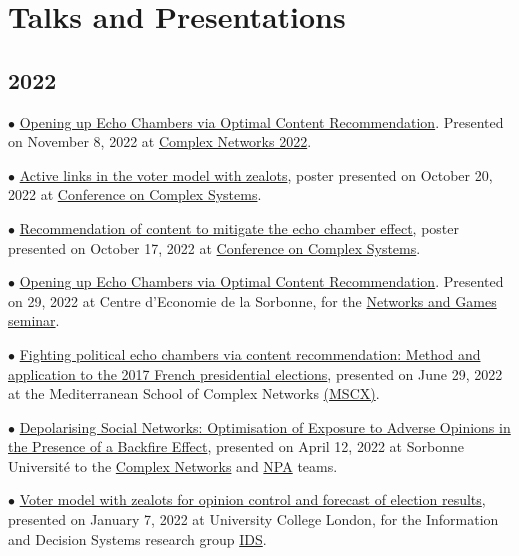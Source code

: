 \documentclass[a4paper,10pt]{article}
\begin{document}
\section*{Talks and Presentations}
\subsection*{2022}

$\bullet$ \href{https://antoinevendeville.github.io/files/talk_NetworksAndGames.pdf}{Opening up Echo Chambers via Optimal Content Recommendation}. Presented on November 8, 2022 at \href{https://complexnetworks.org/}{Complex Networks 2022}.

$\bullet$ \href{https://antoinevendeville.github.io/files/poster_ccs2022_voter.pdf}{Active links in the voter model with zealots}, poster presented on October 20, 2022 at \href{https://ccs2022.org/}{Conference on Complex Systems}.

$\bullet$ \href{https://antoinevendeville.github.io/files/poster_ccs2022_echo.pdf}{Recommendation of content to mitigate the echo chamber effect}, poster presented on October 17, 2022 at \href{https://ccs2022.org/}{Conference on Complex Systems}.

$\bullet$ \href{https://antoinevendeville.github.io/files/talk_NetworksAndGames.pdf}{Opening up Echo Chambers via Optimal Content Recommendation}. Presented on 29, 2022 at Centre d’Economie de la Sorbonne, for the \href{https://sites.google.com/site/cesworkinggroupnetworks/}{Networks and Games seminar}.

$\bullet$ \href{https://antoinevendeville.github.io/files/presCatania.pdf}{Fighting political echo chambers via content recommendation: Method and application to the 2017 French presidential elections}, presented on June 29, 2022 at the Mediterranean School of Complex Networks \href{https://mediterraneanschoolcomplex.net/}{(MSCX)}.

$\bullet$ \href{https://antoinevendeville.github.io/files/talk_NPA}{Depolarising Social Networks: Optimisation of Exposure to Adverse Opinions in the Presence of a Backfire Effect}, presented on April 12, 2022 at Sorbonne Université to the \href{https://www.complexnetworks.fr/}{Complex Networks} and \href{https://www-npa.lip6.fr/}{NPA} teams.

$\bullet$ \href{https://antoinevendeville.github.io/files/talk_IDS.pdf}{Voter model with zealots for opinion control and forecast of election results}, presented on January 7, 2022 at University College London, for the Information and Decision Systems research group \href{https://www.ucl.ac.uk/computer-science/research/research-groups/information-and-decision-systems-ids}{IDS}.
\end{document}
